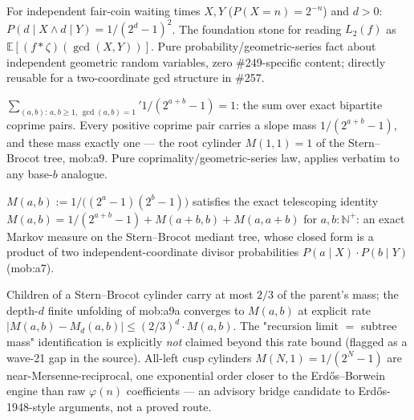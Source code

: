 \begin{prop}
For independent fair-coin waiting times $X,Y$ ($P(X=n)=2^{-n}$) and $d>0$: $P(d\mid X \wedge d\mid Y) = 1/(2^d-1)^2$. The foundation stone for reading $L_2(f)$ as $\mathbb{E}[(f*\zeta)(\gcd(X,Y))]$. Pure probability/geometric-series fact about independent geometric random variables, zero \#249-specific content; directly reusable for a two-coordinate gcd structure in \#257.
\par\noindent{}   
\end{prop}

\begin{prop}
$\sum_{(a,b):\, a,b\ge1,\, \gcd(a,b)=1}' 1/(2^{a+b}-1) = 1$: the sum over exact bipartite coprime pairs. Every positive coprime pair carries a slope mass $1/(2^{a+b}-1)$, and these mass exactly one — the root cylinder $M(1,1)=1$ of the Stern--Brocot tree, mob:a9. Pure coprimality/geometric-series law, applies verbatim to any base-$b$ analogue.
\par\noindent{}   
\end{prop}

\begin{prop}
$M(a,b) := 1/\big((2^a-1)(2^b-1)\big)$ satisfies the exact telescoping identity $M(a,b) = 1/(2^{a+b}-1) + M(a+b,b) + M(a,a+b)$ for $a,b:\mathbb{N}^+$: an exact Markov measure on the Stern--Brocot mediant tree, whose closed form is a product of two independent-coordinate divisor probabilities $P(a\mid X)\cdot P(b\mid Y)$ (mob:a7).
\par\noindent{}   
\end{prop}

\begin{prop}
Children of a Stern--Brocot cylinder carry at most $2/3$ of the parent's mass; the depth-$d$ finite unfolding of mob:a9a converges to $M(a,b)$ at explicit rate $|M(a,b) - M_d(a,b)| \le (2/3)^d\cdot M(a,b)$. The "recursion limit $=$ subtree mass" identification is explicitly \emph{not} claimed beyond this rate bound (flagged as a wave-21 gap in the source). All-left cusp cylinders $M(N,1) = 1/(2^N-1)$ are near-Mersenne-reciprocal, one exponential order closer to the Erd\H{o}s--Borwein engine than raw $\varphi(n)$ coefficients — an advisory bridge candidate to Erd\H{o}s-1948-style arguments, not a proved route.
\par\noindent{}    
\end{prop}

